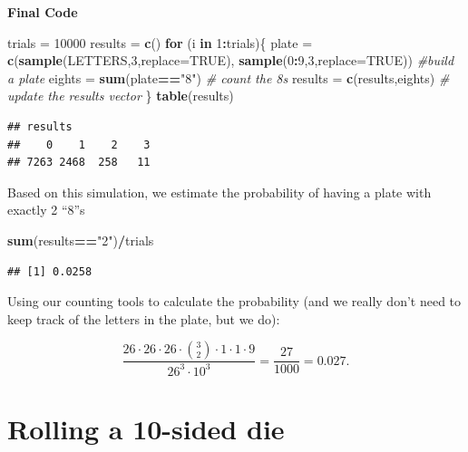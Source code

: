 \documentclass[
]{book}
\newenvironment{Shaded}{\begin{snugshade}}{\end{snugshade}}
\newcommand{\AttributeTok}[1]{\textcolor[rgb]{0.13,0.29,0.53}{#1}}
\newcommand{\CommentTok}[1]{\textcolor[rgb]{0.56,0.35,0.01}{\textit{#1}}}
\newcommand{\ConstantTok}[1]{\textcolor[rgb]{0.56,0.35,0.01}{#1}}
\newcommand{\ControlFlowTok}[1]{\textcolor[rgb]{0.13,0.29,0.53}{\textbf{#1}}}
\newcommand{\DecValTok}[1]{\textcolor[rgb]{0.00,0.00,0.81}{#1}}
\newcommand{\FunctionTok}[1]{\textcolor[rgb]{0.13,0.29,0.53}{\textbf{#1}}}
\newcommand{\NormalTok}[1]{#1}
\newcommand{\OtherTok}[1]{\textcolor[rgb]{0.56,0.35,0.01}{#1}}
\newcommand{\SpecialCharTok}[1]{\textcolor[rgb]{0.81,0.36,0.00}{\textbf{#1}}}
\newcommand{\StringTok}[1]{\textcolor[rgb]{0.31,0.60,0.02}{#1}}
\theoremstyle{definition}
\theoremstyle{definition}
\theoremstyle{definition}
\theoremstyle{definition}
\theoremstyle{remark}
\begin{document}
\textbf{Final Code}

\begin{Shaded}
\begin{Highlighting}[]
\NormalTok{trials }\OtherTok{=} \DecValTok{10000}
\NormalTok{results }\OtherTok{=} \FunctionTok{c}\NormalTok{()}
\ControlFlowTok{for}\NormalTok{ (i }\ControlFlowTok{in} \DecValTok{1}\SpecialCharTok{:}\NormalTok{trials)\{}
\NormalTok{  plate }\OtherTok{=} \FunctionTok{c}\NormalTok{(}\FunctionTok{sample}\NormalTok{(LETTERS,}\DecValTok{3}\NormalTok{,}\AttributeTok{replace=}\ConstantTok{TRUE}\NormalTok{),}
            \FunctionTok{sample}\NormalTok{(}\DecValTok{0}\SpecialCharTok{:}\DecValTok{9}\NormalTok{,}\DecValTok{3}\NormalTok{,}\AttributeTok{replace=}\ConstantTok{TRUE}\NormalTok{)) }\CommentTok{\#build a plate}
\NormalTok{  eights }\OtherTok{=} \FunctionTok{sum}\NormalTok{(plate}\SpecialCharTok{==}\StringTok{"8"}\NormalTok{) }\CommentTok{\# count the 8s}
\NormalTok{  results }\OtherTok{=} \FunctionTok{c}\NormalTok{(results,eights) }\CommentTok{\# update the results vector}
\NormalTok{\}}
\FunctionTok{table}\NormalTok{(results)}
\end{Highlighting}
\end{Shaded}

\begin{verbatim}
## results
##    0    1    2    3 
## 7263 2468  258   11
\end{verbatim}

Based on this simulation, we estimate the probability of having a plate with exactly 2 ``8''s

\begin{Shaded}
\begin{Highlighting}[]
\FunctionTok{sum}\NormalTok{(results}\SpecialCharTok{==}\StringTok{"2"}\NormalTok{)}\SpecialCharTok{/}\NormalTok{trials}
\end{Highlighting}
\end{Shaded}

\begin{verbatim}
## [1] 0.0258
\end{verbatim}

Using our counting tools to calculate the probability (and we really don't need to keep track of the letters in the plate, but we do):

\[\frac{26\cdot 26\cdot 26 \cdot \binom{3}{2} \cdot 1 \cdot 1 \cdot 9}{26^3\cdot 10^3}= \frac{27}{1000} = 0.027.\]

\section{Rolling a 10-sided die}\label{10sided-die-R}
\end{document}
